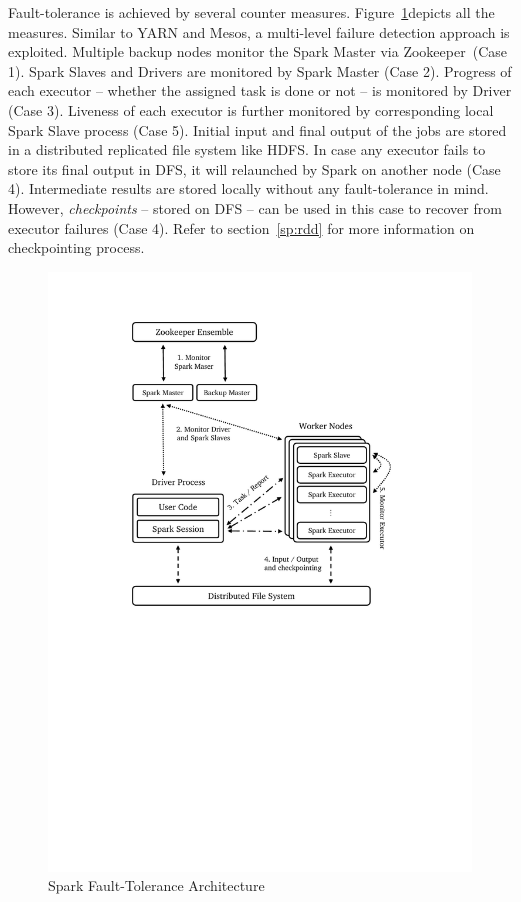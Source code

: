 \begin{description}[leftmargin=0pt]
     Fault-tolerance is achieved by several counter measures. Figure~\ref{fig:spark-full}\footnotemark depicts all the measures. Similar to YARN and Mesos, a multi-level failure detection approach is exploited. Multiple backup nodes monitor the Spark Master via Zookeeper~(Case 1). Spark Slaves and Drivers are monitored by Spark Master (Case 2). Progress of each executor -- whether the assigned task is done or not -- is monitored by Driver (Case 3). Liveness of each executor is further monitored by corresponding local Spark Slave process (Case 5). Initial input and final output of the jobs are stored in a distributed replicated file system like HDFS. In case any executor fails to store its final output in DFS, it will relaunched by Spark on another node (Case 4). Intermediate results are stored locally without any fault-tolerance in mind. However, \emph{checkpoints} -- stored on DFS -- can be used in this case to recover from executor failures (Case 4). Refer to section~\ref{sp:rdd} for more information on checkpointing process. 
     \begin{figure}[h]
         \centering
         \includegraphics[clip,trim=4cm 13cm 4cm 2.2cm]{spark-full.pdf}
         \caption[Spark Fault-Tolerance Architecture]{Spark Fault-Tolerance Architecture}
         \label{fig:spark-full}
     \end{figure}
\end{description}

